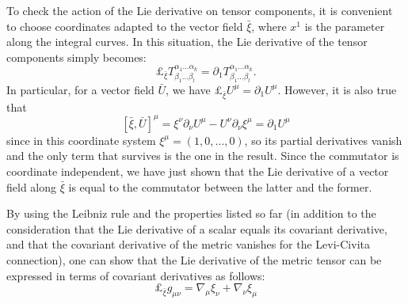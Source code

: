 \documentclass[a4paper]{article}
\begin{document}
To check the action of the Lie derivative on tensor components, it is convenient to choose coordinates adapted to the vector field $\bar{\xi}$, where $x^1$ is the parameter along the integral curves. In this situation, the Lie derivative of the tensor components simply becomes:
$$\pounds_{\bar{\xi}}T^{\alpha_1\ldots \alpha_k}_{\beta_1\ldots\beta_l} = \partial_1 T^{\alpha_1\ldots \alpha_k}_{\beta_1\ldots\beta_l}.$$
In particular, for a vector field $\bar{U}$, we have $\pounds_{\bar{\xi}}U^{\mu} = \partial_1 U^{\mu}$.
However, it is also true that
$$[\bar{\xi},\bar{U}]^{\mu} = \xi^{\nu}\partial_{\nu}U^{\mu} - U^{\nu}\partial_{\nu}\xi^{\mu} = \partial_1 U^{\mu}$$
since in this coordinate system $\xi^{\mu} = (1,0,\ldots,0)$, so its partial derivatives vanish and the only term that survives is the one in the result. Since the commutator is coordinate independent, we have just shown that the Lie derivative of a vector field along $\bar{\xi}$ is equal to the commutator between the latter and the former.

By using the Leibniz rule and the properties listed so far (in addition to the consideration that the Lie derivative of a scalar equals its covariant derivative, and that the covariant derivative of the metric vanishes for the Levi-Civita connection), one can show that the Lie derivative of the metric tensor can be expressed in terms of covariant derivatives as follows:
\begin{equation}
  \pounds_{\bar{\xi}}g_{\mu\nu} = \nabla_{\mu}\xi_{\nu} + \nabla_{\nu}\xi_{\mu}
  \label{eq:lie-metric}
\end{equation}
\end{document}
